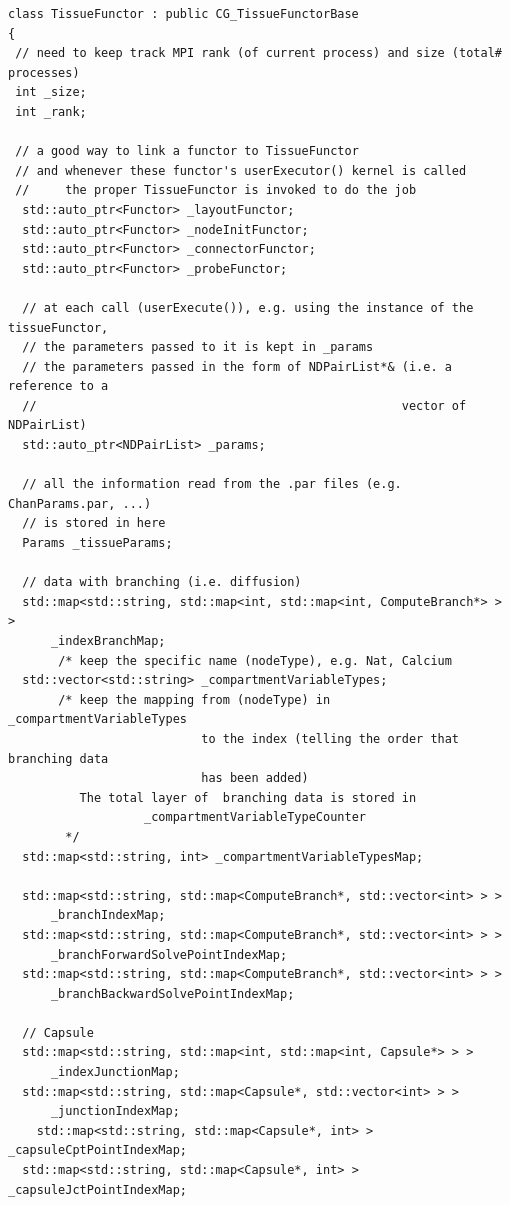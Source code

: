 {\small
\begin{lstlisting}
class TissueFunctor : public CG_TissueFunctorBase
{
 // need to keep track MPI rank (of current process) and size (total# processes)
 int _size;
 int _rank;
 
 // a good way to link a functor to TissueFunctor
 // and whenever these functor's userExecutor() kernel is called
 //     the proper TissueFunctor is invoked to do the job
  std::auto_ptr<Functor> _layoutFunctor;
  std::auto_ptr<Functor> _nodeInitFunctor;
  std::auto_ptr<Functor> _connectorFunctor;
  std::auto_ptr<Functor> _probeFunctor; 
  
  // at each call (userExecute()), e.g. using the instance of the tissueFunctor,
  // the parameters passed to it is kept in _params
  // the parameters passed in the form of NDPairList*& (i.e. a reference to a
  //                                                   vector of NDPairList)
  std::auto_ptr<NDPairList> _params;
  
  // all the information read from the .par files (e.g. ChanParams.par, ...)
  // is stored in here
  Params _tissueParams;

  // data with branching (i.e. diffusion)
  std::map<std::string, std::map<int, std::map<int, ComputeBranch*> > >
      _indexBranchMap;
       /* keep the specific name (nodeType), e.g. Nat, Calcium
  std::vector<std::string> _compartmentVariableTypes;
       /* keep the mapping from (nodeType) in _compartmentVariableTypes
                           to the index (telling the order that branching data
                           has been added)
          The total layer of  branching data is stored in
                   _compartmentVariableTypeCounter
        */
  std::map<std::string, int> _compartmentVariableTypesMap;
  
  std::map<std::string, std::map<ComputeBranch*, std::vector<int> > >
      _branchIndexMap;
  std::map<std::string, std::map<ComputeBranch*, std::vector<int> > >
      _branchForwardSolvePointIndexMap;
  std::map<std::string, std::map<ComputeBranch*, std::vector<int> > >
      _branchBackwardSolvePointIndexMap;
      
  // Capsule
  std::map<std::string, std::map<int, std::map<int, Capsule*> > >
      _indexJunctionMap;
  std::map<std::string, std::map<Capsule*, std::vector<int> > >
      _junctionIndexMap;
    std::map<std::string, std::map<Capsule*, int> > _capsuleCptPointIndexMap;
  std::map<std::string, std::map<Capsule*, int> > _capsuleJctPointIndexMap;




\end{lstlisting}}
